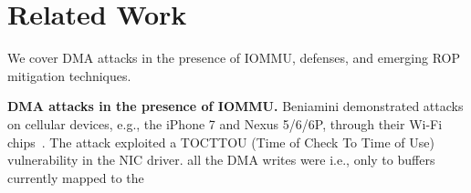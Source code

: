 \section{Related Work}
We cover DMA attacks in the presence of IOMMU, defenses, and emerging ROP mitigation techniques.

\smallskip
\noindent\textbf{DMA attacks in the presence of IOMMU.}
Beniamini demonstrated attacks on cellular devices, e.g., the iPhone 7 and Nexus 5/6/6P, through their Wi-Fi chips~\cite{Ben17a, Ben17b}. 
The attack exploited a TOCTTOU (Time of Check To Time of Use) vulnerability in the NIC driver. \DIFdelbegin {}\DIFdelend \DIFaddbegin {}\simple {}\DIFaddend all the DMA writes were \DIFdelbegin {}\DIFdelend \DIFaddbegin {}\DIFaddend i.e., only to buffers currently mapped to the \DIFdelbegin {}\DIFdelend \DIFaddbegin {}



